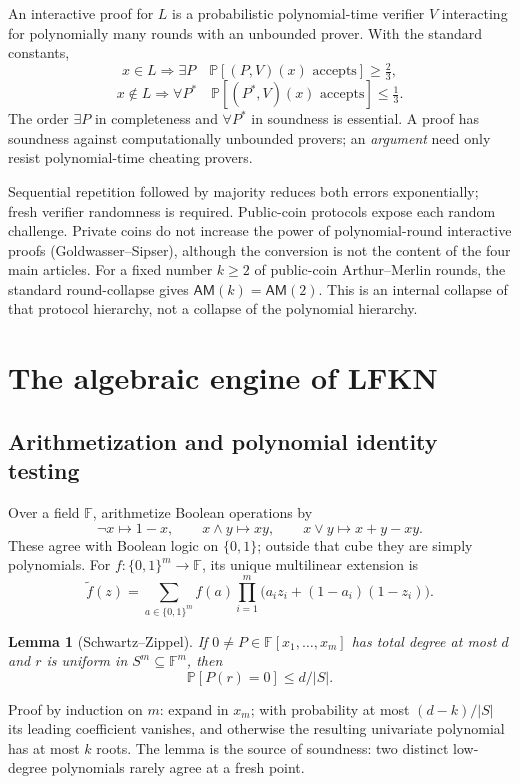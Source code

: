 \documentclass[10pt]{article}
\newcommand{\F}{\mathbb F}
\newcommand{\Prb}{\mathbb P}
\newcommand{\AM}{\mathsf{AM}}
\newtheorem*{lemma}{Lemma}
\begin{document}
An interactive proof for $L$ is a probabilistic polynomial-time verifier $V$
interacting for polynomially many rounds with an unbounded prover.  With the
standard constants,
\[
 x\in L\Longrightarrow \exists P\quad
   \Prb[(P,V)(x)\text{ accepts}]\geq\tfrac23,
\]
\[
 x\notin L\Longrightarrow \forall P^*\quad
   \Prb[(P^*,V)(x)\text{ accepts}]\leq\tfrac13.
\]
The order $\exists P$ in completeness and $\forall P^*$ in soundness is
essential.  A proof has soundness against computationally unbounded provers;
an \emph{argument} need only resist polynomial-time cheating provers.

Sequential repetition followed by majority reduces both errors exponentially;
fresh verifier randomness is required.  Public-coin protocols expose each random
challenge.  Private coins do not increase the power of polynomial-round
interactive proofs (Goldwasser--Sipser), although the conversion is not the
content of the four main articles.  For a fixed number $k\geq2$ of public-coin
Arthur--Merlin rounds, the standard round-collapse gives $\AM(k)=\AM(2)$.
This is an internal collapse of that protocol hierarchy, not a collapse of the
polynomial hierarchy.

\section{The algebraic engine of LFKN}

\subsection{Arithmetization and polynomial identity testing}

Over a field $\F$, arithmetize Boolean operations by
\[
 \neg x\mapsto1-x,\qquad x\wedge y\mapsto xy,
 \qquad x\vee y\mapsto x+y-xy.
\]
These agree with Boolean logic on $\{0,1\}$; outside that cube they are simply
polynomials.  For $f:\{0,1\}^m\to\F$, its unique multilinear extension is
\[
 \widetilde f(z)=\sum_{a\in\{0,1\}^m} f(a)
 \prod_{i=1}^m\bigl(a_i z_i+(1-a_i)(1-z_i)\bigr).
\]

\begin{lemma}[Schwartz--Zippel]
If $0\neq P\in\F[x_1,\ldots,x_m]$ has total degree at most $d$ and
$r$ is uniform in $S^m\subseteq\F^m$, then
\[
 \Prb[P(r)=0]\leq d/|S|.
\]
\end{lemma}
Proof by induction on $m$: expand in $x_m$; with probability at most
$(d-k)/|S|$ its leading coefficient vanishes, and otherwise the resulting
univariate polynomial has at most $k$ roots.  The lemma is the source of
soundness: two distinct low-degree polynomials rarely agree at a fresh point.
\end{document}
